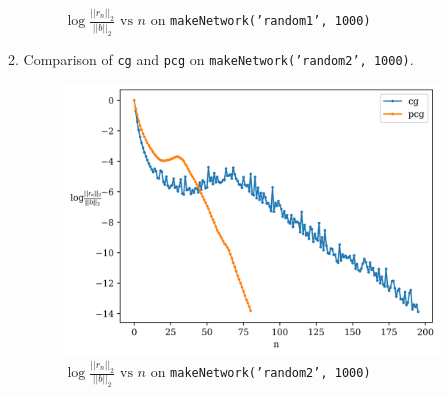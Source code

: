 \documentclass{article}
\begin{document}
\begin{enumerate}
\begin{enumerate}[label=(\alph*)]
\begin{figure}[!ht]
            \caption{$\log\frac{||r_n||_2}{||b||_2} \textrm{ vs } n$ on \texttt{makeNetwork('random1', 1000)}}
        \end{figure}
        \item Comparison of \texttt{cg} and \texttt{pcg} on \texttt{makeNetwork('random2', 1000)}.
        \begin{figure}[!ht]
            \centering
            \includegraphics[scale=0.65]{fig2.png}
            \caption{$\log\frac{||r_n||_2}{||b||_2} \textrm{ vs } n$ on \texttt{makeNetwork('random2', 1000)}}
        \end{figure}
    \end{enumerate}
\end{enumerate}
\end{document}
